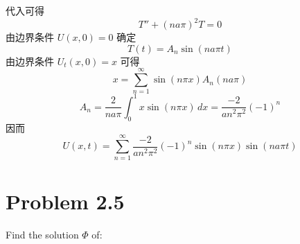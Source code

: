 \documentclass[a4paper]{article}
\begin{document}
\begin{enumerate}
\begin{equation*}
        \end{equation*}
        代入可得
        \begin{equation*}
            T'' + (na\pi)^2 T = 0
        \end{equation*}
        由边界条件 $U(x,0) = 0$ 确定
        \begin{equation*}
            T(t) = A_n\sin\left(na\pi t\right)
        \end{equation*}
        由边界条件 $U_t(x,0) = x$ 可得
        \begin{equation*}
            x = \sum_{n=1}^{\infty} \sin\left(n\pi x\right) A_n (na\pi)
        \end{equation*}
        \begin{equation*}
            A_n = \frac{2}{na\pi}\int_0^1 x \sin\left(n\pi x\right) \, dx
            = \frac{-2}{an^2\pi^2}(-1)^n
        \end{equation*}
        因而
        \begin{equation*}
            U(x,t) = \sum_{n=1}^{\infty} \frac{-2}{an^2\pi^2}(-1)^n \sin\left(n\pi x\right) \sin\left(na\pi t\right)
        \end{equation*}
    \end{enumerate}

    \section*{Problem 2.5}

    Find the solution \(\Phi\) of:
\end{document}

